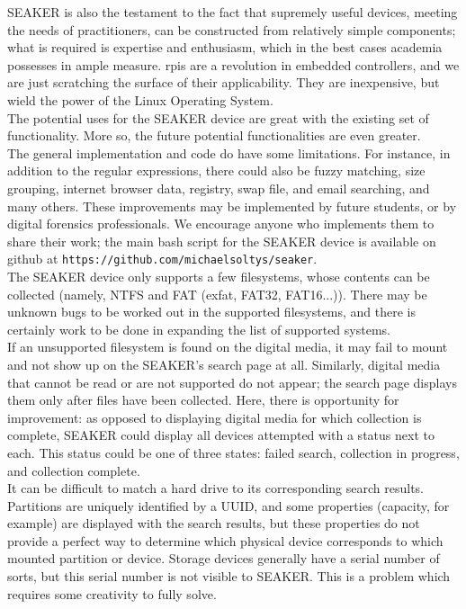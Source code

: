 \documentclass[12pt]{article}
\begin{document}
SEAKER is also the testament to the fact that supremely useful devices, meeting the needs of
practitioners, can be constructed from relatively simple components; what is required is expertise and
enthusiasm, which in the best cases academia possesses in ample measure. \glspl{rpi} are a revolution in
embedded controllers, and we are just scratching the surface of their applicability. They are inexpensive,
but wield the power of the Linux Operating System.\\

The potential uses for the SEAKER device are great with the existing set of
functionality.  More so, the future potential functionalities are even greater.\\

The general implementation and code do have some limitations.  For instance,
in addition to the regular expressions, there could also be fuzzy matching, size
grouping, internet browser data, registry, swap file, and email searching, and
many others.  These improvements may be implemented by future students, or by digital
forensics professionals. We encourage anyone who implements them to share their work; the main bash
script for the SEAKER device is available on github at {\tt https://github.com/michaelsoltys/seaker}.\\

The SEAKER device only supports a few filesystems, whose contents can be collected
(namely, NTFS and FAT (exfat, FAT32, FAT16...)). There may be unknown bugs to be worked out
in the supported filesystems, and there is certainly work to be done in expanding the
list of supported systems.\\

If an unsupported filesystem is found on the digital media, it may fail to
mount and not show up on the SEAKER's search page at all. Similarly, digital
media that cannot be read or are not supported do not appear; the search page
displays them only after files have been collected. Here, there is opportunity
for improvement: as opposed to displaying digital media for which collection is
complete, SEAKER could display all devices attempted with a status next to each. This
status could be one of three states: failed search,
collection in progress, and collection complete.\\

It can be difficult to match a hard drive to its corresponding search results. Partitions are uniquely
identified by a UUID, and some properties (capacity, for example) are displayed with the search results,
but these properties do not provide a perfect way to determine which physical device corresponds to
which mounted partition or device. Storage devices generally have a serial number of sorts, but this
serial number is not visible to SEAKER. This is a problem which requires some creativity to fully solve.\\
\end{document}
